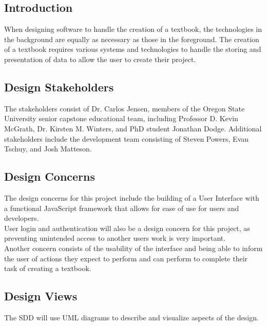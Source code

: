 \documentclass[onecolumn, draftclsnofoot,10pt, compsoc]{IEEEtran}
\begin{document}
\subsection{Introduction}
\noindent When designing software to handle the creation of a textbook,
the technologies in the background are equally as necessary as those in 
the foreground. The creation of a textbook requires various systems 
and technologies to handle the storing and presentation of data to allow 
the user to create their project.\\


\subsection{Design Stakeholders}
\noindent The stakeholders consist of Dr. Carlos Jensen, members of the Oregon
State University senior capstone educational team, including Professor 
D. Kevin McGrath, Dr. Kirsten M. Winters, and PhD student Jonathan Dodge.
Additional stakeholders include the development team consisting of 
Steven Powers, Evan Tschuy, and Josh Matteson.\\

\subsection{Design Concerns}
\noindent The design concerns for this project include the building of a 
User Interface with a functional JavaScript framework that allows for 
ease of use for users and developers. \\

\noindent User login and authentication will also be a design concern for 
this project, as preventing unintended access to another users work is 
very important. \\

\noindent Another concern consists of the usability of the interface 
and being able to inform the user of actions they expect to perform and can perform to complete their task of creating a textbook. \\

\subsection{Design Views}
\noindent The SDD will use UML diagrams to describe and visualize aspects of the design. \\
\end{document}

